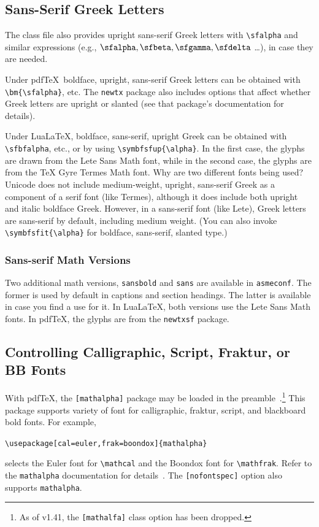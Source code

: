 \documentclass[colorlinks,upint,subscriptcorrection,varvw,hyphenate,balance,greek,russian,vietnamese,german]{asmeconf} %
\newcommand*\pdfTeX{pdf\TeX}
\newcommand*\LuaLaTeX{Lua\LaTeX}
\begin{document}
\subsection{Sans-Serif Greek Letters}
The class file also provides upright sans-serif Greek letters with \verb|\sfalpha| and similar expressions (e.g., $\sfalpha, \sfbeta, \sfgamma, \sfdelta$ \ldots ), in case they are needed. 

Under \pdfTeX\  boldface, upright, sans-serif Greek letters can be obtained with \verb|\bm{\sfalpha}|, etc.  The \texttt{newtx} package also includes options that affect whether Greek letters are upright or slanted (see that package's documentation for details).

Under \LuaLaTeX, boldface, sans-serif, upright Greek can be obtained with \verb|\sfbfalpha|, etc., or by using \verb|\symbfsfup{\alpha}|.  In the first case, the glyphs are drawn from the Lete Sans Math font, while in the second case, the glyphs are from the TeX Gyre Termes Math font.   Why are two different fonts being used? Unicode does not include medium-weight, upright, sans-serif Greek as a component of a serif font (like Termes), although it does include both upright and italic boldface Greek. However, in a sans-serif font (like Lete), Greek letters are sans-serif by default, including medium weight. (You can also invoke \verb|\symbfsfit{\alpha}| for  boldface, sans-serif, slanted type.) 

\subsubsection*{Sans-serif Math Versions} Two additional math versions, \texttt{sansbold} and \texttt{sans} are available in \texttt{asmeconf}.  The former is used by default in captions and section headings.  The latter is available in case you find a use for it. In \LuaLaTeX, both versions use the Lete Sans Math fonts. In \pdfTeX, the glyphs are from the \texttt{newtxsf} package.
  
  
\subsection{Controlling Calligraphic, Script, Fraktur, or BB Fonts}
With \pdfTeX, the \texttt{[mathalpha]} package may be loaded in the preamble~\cite{sharpe2}.\footnote{As of v1.41, the \texttt{[mathalfa]} class option has been dropped.} This package supports variety of font for calligraphic, fraktur, script, and blackboard bold fonts. For example,
\begin{center}
\verb|\usepackage[cal=euler,frak=boondox]{mathalpha}| 
\end{center}
selects the Euler font for \verb|\mathcal| and the Boondox font for \verb|\mathfrak|. Refer to the \texttt{mathalpha} documentation for details~\cite{sharpe2}.  The \texttt{[nofontspec]} option also supports \texttt{mathalpha}.
\end{document}
